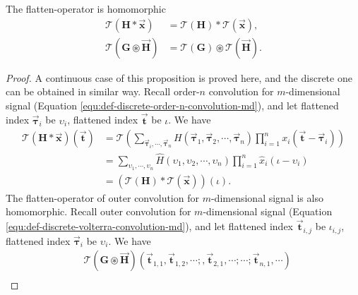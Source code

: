 \documentclass[twoside,11pt]{article}
\def\oconv{\circledast}
\def\tvar#1{\mathbf{#1}} %
\def\vsymb#1{\vec{\mathbf{#1}}}
\begin{document}
\begin{proposition}
  The flatten-operator is homomorphic
  \begin{equation}
    \begin{aligned}
      \mathcal{T}(\tvar{H} * \vsymb{x})
       & = \mathcal{T}(\tvar{H}) * \mathcal{T}(\vsymb{x}),      \\
      \mathcal{T}( \tvar{G} \oconv \vsymb{H} )
       & = \mathcal{T}(\tvar{G}) \oconv \mathcal{T}(\vsymb{H}).
    \end{aligned}
  \end{equation}
  \label{proposition:flatten-operator-is-homorphic}
\end{proposition}

\begin{proof}
  A continuous case of this proposition is proved here, and the discrete one can be obtained in similar way.
  Recall order-\(n\) convolution for \(m\)-dimensional signal (Equation \ref{equ:def-discrete-order-n-convolution-md}), and let flattened index \(\vsymb{\tau}_i\) be \(\upsilon_i\), flattened index \(\vsymb{t}\) be \(\iota\). We have
  \begin{equation*}
    \begin{aligned}
      \mathcal{T}(\tvar{H} * \vsymb{x})(\vsymb{t})
       & = \mathcal{T}\left(\sum_{\vsymb{\tau}_i, \cdots, \vsymb{\tau}_n} H(\vsymb{\tau}_1, \vsymb{\tau}_2, \cdots, \vsymb{\tau}_n) \prod_{i=1}^{n} x_i(\vsymb{t} - \vsymb{\tau}_i) \right) \\
       & = \sum_{\upsilon_1, \cdots, \upsilon_n} \hat{H}(\upsilon_1, \upsilon_2, \cdots, \upsilon_n) \prod_{i=1}^{n} \hat{x}_i(\iota - \upsilon_i)                                          \\
       & = \left(\mathcal{T}(\tvar{H}) * \mathcal{T}(\vsymb{x})\right)(\iota).
    \end{aligned}
  \end{equation*}
  The flatten-operator of outer convolution for \(m\)-dimensional signal is also homomorphic.
  Recall outer convolution for \(m\)-dimensional signal (Equation \ref{equ:def-discrete-volterra-convolution-md}), and let flattened index  \(\vsymb{t}_{i,j}\) be \(\iota_{i,j}\), flattened index  \(\vsymb{\tau}_{i}\) be \(\upsilon_{i}\). We have
  \begin{equation*}
    \begin{aligned}
       & \mathcal{T}(\tvar{G} \oconv \vsymb{H})(\vsymb{t}_{1,1}, \vsymb{t}_{1,2}, \cdots;, \vsymb{t}_{2,1}, \cdots; \cdots; \vsymb{t}_{n,1}, \cdots)               \\

\end{aligned}
\end{equation*}
\end{proof}
\end{document}
